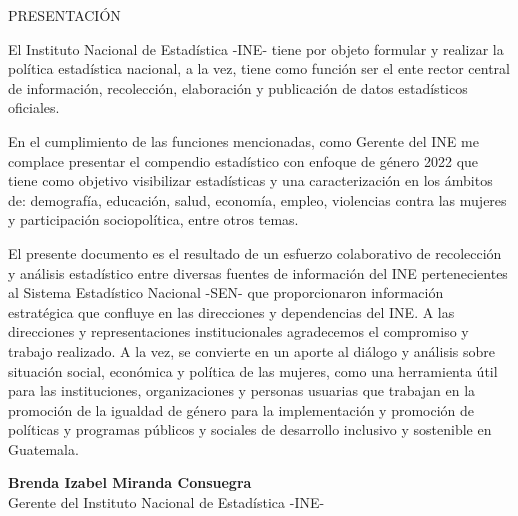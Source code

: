 $\ $\\[3cm]
\begin{center}
{\Bold \LARGE PRESENTACIÓN}\\[2cm]
\end{center}

El Instituto Nacional de Estadística -INE- tiene por objeto formular y realizar la política estadística nacional, a la vez, tiene como función ser el ente rector central de información, recolección, elaboración y publicación de datos estadísticos oficiales.  

En el cumplimiento de las funciones mencionadas, como Gerente del INE me complace presentar el compendio estadístico con enfoque de género 2022 que tiene como objetivo visibilizar estadísticas y una caracterización en los ámbitos de: demografía, educación, salud, economía, empleo, violencias contra las mujeres y participación sociopolítica, entre otros temas. 

El presente documento es el resultado de un esfuerzo colaborativo de recolección y análisis estadístico entre diversas fuentes de información del INE pertenecientes al Sistema Estadístico Nacional -SEN- que proporcionaron información estratégica que confluye en las direcciones y dependencias del INE. A las direcciones y representaciones institucionales agradecemos el compromiso y trabajo realizado. A la vez, se convierte en un aporte al diálogo y análisis sobre situación social, económica y política de las mujeres, como una herramienta útil para las instituciones, organizaciones y personas usuarias que trabajan en la promoción de la igualdad de género para la implementación y promoción de políticas y programas públicos y sociales de desarrollo inclusivo y sostenible en Guatemala.\\[3cm]

\begin{center}
\textbf{Brenda Izabel Miranda Consuegra}\\[0.2cm]
Gerente del Instituto Nacional de Estadística -INE-
\end{center}

